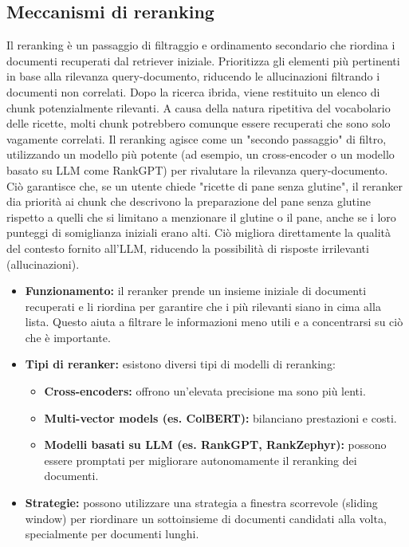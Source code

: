 \documentclass[a4paper, 11pt]{article}
\begin{document}
\subsection{Meccanismi di reranking}
Il reranking è un passaggio di filtraggio e ordinamento secondario che riordina i documenti recuperati dal retriever iniziale. \cite{mastering_rag_reranking} Prioritizza gli elementi più pertinenti in base alla rilevanza query-documento, riducendo le allucinazioni filtrando i documenti non correlati. \cite{mastering_rag_reranking} Dopo la ricerca ibrida, viene restituito un elenco di chunk potenzialmente rilevanti. A causa della natura ripetitiva del vocabolario delle ricette, molti chunk potrebbero comunque essere recuperati che sono solo vagamente correlati. Il reranking agisce come un "secondo passaggio" di filtro, utilizzando un modello più potente (ad esempio, un cross-encoder o un modello basato su LLM come RankGPT) per rivalutare la rilevanza query-documento. Ciò garantisce che, se un utente chiede "ricette di pane senza glutine", il reranker dia priorità ai chunk che descrivono la preparazione del pane senza glutine rispetto a quelli che si limitano a menzionare il glutine o il pane, anche se i loro punteggi di somiglianza iniziali erano alti. Ciò migliora direttamente la qualità del contesto fornito all'LLM, riducendo la possibilità di risposte irrilevanti (allucinazioni). \cite{mastering_rag_reranking}
\begin{itemize}
    \item \textbf{Funzionamento:} il reranker prende un insieme iniziale di documenti recuperati e li riordina per garantire che i più rilevanti siano in cima alla lista. \cite{rankgpt_reranking} Questo aiuta a filtrare le informazioni meno utili e a concentrarsi su ciò che è importante.
    \item \textbf{Tipi di reranker:} esistono diversi tipi di modelli di reranking:
    \begin{itemize}
        \item \textbf{Cross-encoders:} offrono un'elevata precisione ma sono più lenti. \cite{mastering_rag_reranking}
        \item \textbf{Multi-vector models (es. ColBERT):} bilanciano prestazioni e costi. \cite{mastering_rag_reranking}
        \item \textbf{Modelli basati su LLM (es. RankGPT, RankZephyr):} possono essere promptati per migliorare autonomamente il reranking dei documenti. \cite{mastering_rag_reranking}
    \end{itemize}
    \item \textbf{Strategie:} possono utilizzare una strategia a finestra scorrevole (sliding window) per riordinare un sottoinsieme di documenti candidati alla volta, specialmente per documenti lunghi. \cite{mastering_rag_reranking}
\end{itemize}
\end{document}

